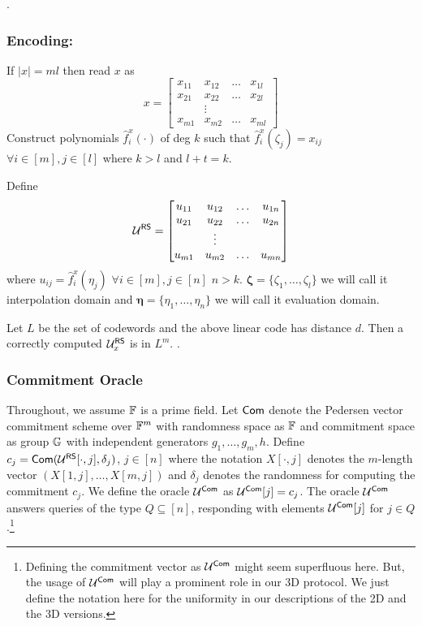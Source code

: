 .
\subsubsection{Encoding:}\label{subsec: encode} 
If $|x|=ml$ then read $x$ as 
$$x=
\begin{bmatrix}
x_{11} & x_{12} & \ldots & x_{1l}\\
x_{21} & x_{22} & \ldots & x_{2l}\\
& \vdots\\
x_{m1} & x_{m2} & \ldots & x_{ml}
\end{bmatrix}
$$	
Construct polynomials $\hat{f}^x_i(\cdot)$ of deg $k$ such that $\hat{f}^x_i(\zeta_j)=x_{ij}$ $\forall i\in [m], j\in [l]$ where $k>l$ and $l+t=k$.

Define 
$$ \mathcal{U}^{\mathsf{RS}} =
\begin{bmatrix}
u_{11} & u_{12} & \ldots & u_{1n}\\
u_{21} & u_{22} & \ldots & u_{2n}\\
& \vdots\\
u_{m1} & u_{m2} & \ldots & u_{mn}
\end{bmatrix}
$$
where $u_{ij}= \hat{f}^x_i(\eta_j)$ $\forall i\in[m], j\in[n]$ $n>k$. $\bm{\zeta}=\{\zeta_1,\ldots,\zeta_l\}$ we will call it interpolation domain and $\bm{\eta} = \{\eta_1,\ldots,\eta_n\}$ we will call it evaluation domain. 

Let $L$ be the set of codewords and the above linear code has distance $d$. Then a correctly computed $\mathcal{U}^{\mathsf{RS}}_x$ is in $L^m$.
.
 
\subsubsection{Commitment Oracle}
Throughout, we assume $\mathbb{F}$ is a prime field. Let $\mathsf{Com}$ denote the Pedersen vector commitment scheme over $\mathbb{F}^m$ with randomness space as $\mathbb{F}$ and commitment space as group $\mathbb{G}$ with independent generators $g_1,\ldots,g_m, h$. Define $c_{j} = \mathsf{Com}(\mathcal{U}^{\mathsf{RS}}[\cdot,j],\delta_{j})$, $j\in [n]$ where the notation $X[\cdot,j]$ denotes the $m$-length vector $(X[1,j],\ldots,X[m,j])$ and $\delta_{j}$ denotes the randomness for computing the commitment $c_{j}$. We define the oracle $\mathcal{U}^{\mathsf{Com}}$ as $\mathcal{U}^{\mathsf{Com}}[j]=c_{j}$. The oracle $\mathcal{U}^{\mathsf{Com}}$ answers queries of the type $Q\subseteq [n]$, responding with elements $\mathcal{U}^{\mathsf{Com}}[j]$ for $j\in Q$.\footnote{Defining the commitment vector as $\mathcal{U}^{\mathsf{Com}}$ might seem superfluous here. But, the usage of $\mathcal{U}^{\mathsf{Com}}$ will play a prominent role in our 3D protocol. We just define the notation here for the uniformity in our descriptions of the 2D and the 3D versions.} 



